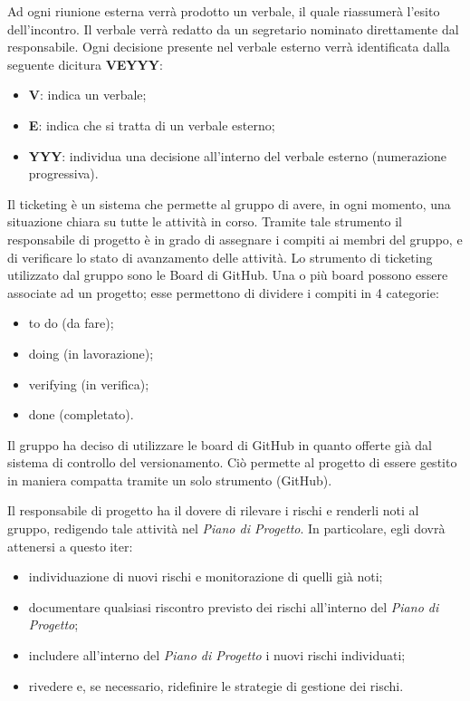 				Ad ogni riunione esterna verrà prodotto un verbale, il quale riassumerà l'esito dell'incontro. Il verbale verrà redatto da un segretario nominato direttamente dal responsabile. Ogni decisione presente nel verbale esterno verrà identificata dalla seguente dicitura \textbf{VEYYY}:
				\begin{itemize}
					\item\textbf{V}: indica un verbale;
					\item\textbf{E}: indica che si tratta di un verbale esterno;
					\item\textbf{YYY}: individua una decisione all'interno del verbale esterno (numerazione progressiva).
				\end{itemize}
			
			
			
				Il ticketing è un sistema che permette al gruppo di avere, in ogni momento, una situazione chiara su tutte le attività in corso. Tramite tale strumento il responsabile di progetto è in grado di assegnare i compiti ai membri del gruppo, e di verificare lo stato di avanzamento delle attività. Lo strumento di ticketing utilizzato dal gruppo sono le Board di GitHub. Una o più board possono essere associate ad un progetto; esse permettono di dividere i compiti in 4 categorie:
					\begin{itemize}
						\item to do (da fare);
						\item doing (in lavorazione);
						\item verifying (in verifica);
						\item done (completato).
					\end{itemize}
				Il gruppo ha deciso di utilizzare le board di GitHub in quanto offerte già dal sistema di controllo del versionamento. Ciò permette al progetto di essere gestito in maniera compatta tramite un solo strumento (GitHub).
			
			
			Il responsabile di progetto ha il dovere di rilevare i rischi e renderli noti al gruppo, redigendo tale attività nel \textit{Piano di Progetto}. In particolare, egli dovrà attenersi a questo iter:
			\begin{itemize}
				\item individuazione di nuovi rischi e monitorazione di quelli già noti;
				\item documentare qualsiasi riscontro previsto dei rischi all'interno del \textit{Piano di Progetto};
				\item includere all'interno del \textit{Piano di Progetto} i nuovi rischi individuati;
				\item rivedere e, se necessario, ridefinire le strategie di gestione dei rischi.
			\end{itemize}
			
